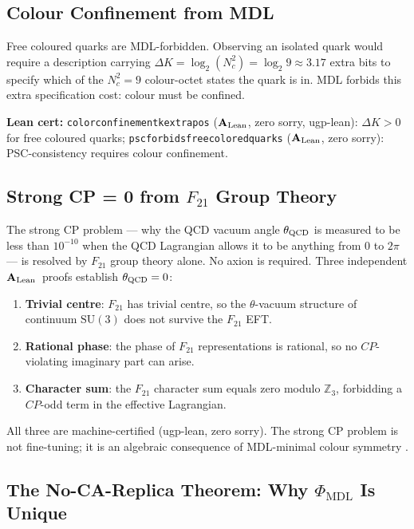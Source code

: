 \documentclass[11pt,openany]{book}
\theoremstyle{remark}
\newcommand{\PHIMDL}{\Phi_{\mathrm{MDL}}}
\newcommand{\lean}[1]{%
  \penalty-100
  \begingroup\def\_{\textunderscore\allowbreak}\texttt{#1}\endgroup}
\newcommand{\CatAL}{\ensuremath{\textbf{A}_{\rm Lean}}}
\begin{document}
\subsection*{Colour Confinement from MDL}

Free coloured quarks are MDL-forbidden.
Observing an isolated quark would require a description carrying
$\Delta K = \log_2(N_c^2) = \log_2 9 \approx 3.17$ extra bits to specify
which of the $N_c^2 = 9$ colour-octet states the quark is in.
MDL forbids this extra specification cost: colour must be confined.

\textbf{Lean cert:} \lean{color\_confinement\_k\_extra\_pos} (\CatAL, zero sorry, ugp-lean):
$\Delta K > 0$ for free coloured quarks;
\lean{psc\_forbids\_free\_colored\_quarks} (\CatAL, zero sorry): PSC-consistency
requires colour confinement.

\subsection*{Strong CP = 0 from $F_{21}$ Group Theory}

The strong CP problem --- why the QCD vacuum angle $\theta_{\rm QCD}$ is measured
to be less than $10^{-10}$ when the QCD Lagrangian allows it to be anything
from $0$ to $2\pi$ --- is resolved by $F_{21}$ group theory alone.
No axion is required.
Three independent \CatAL\ proofs establish $\theta_{\rm QCD} = 0$:

\begin{enumerate}[itemsep=3pt]
\item \textbf{Trivial centre}: $F_{21}$ has trivial centre, so the $\theta$-vacuum
  structure of continuum $\mathrm{SU}(3)$ does not survive the $F_{21}$ EFT.
\item \textbf{Rational phase}: the phase of $F_{21}$ representations is rational,
  so no $CP$-violating imaginary part can arise.
\item \textbf{Character sum}: the $F_{21}$ character sum equals zero modulo $\mathbb{Z}_3$,
  forbidding a $CP$-odd term in the effective Lagrangian.
\end{enumerate}

All three are machine-certified (ugp-lean, zero sorry).
The strong CP problem is not fine-tuning; it is an algebraic consequence of
MDL-minimal colour symmetry \cite{SpivackGTEQCDStructure}.

\subsection*{The No-CA-Replica Theorem: Why $\PHIMDL$ Is Unique}
\end{document}

